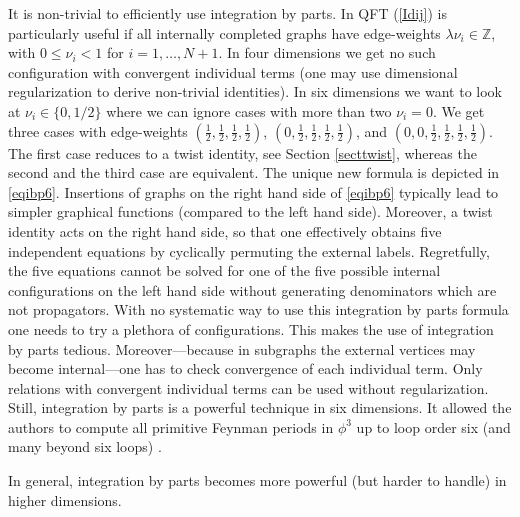\documentclass[oneside]{amsart}
\newcommand{\ZZ}{{\mathbb Z}}
\theoremstyle{plain}
\begin{document}
It is non-trivial to efficiently use integration by parts. In QFT (\ref{Idij}) is particularly useful if all internally completed graphs have edge-weights $\lambda\nu_i\in\ZZ$,
with $0\leq\nu_i<1$ for $i=1,\ldots,N+1$.
In four dimensions we get no such configuration with convergent individual terms (one may use dimensional regularization \cite{numfunct,7loops} to derive non-trivial identities).
In six dimensions we want to look at $\nu_i\in\{0,1/2\}$ where we can ignore cases with more than two $\nu_i=0$. We get three cases with edge-weights
$(\frac{1}{2},\frac{1}{2},\frac{1}{2},\frac{1}{2})$, $(0,\frac{1}{2},\frac{1}{2},\frac{1}{2},\frac{1}{2})$, and $(0,0,\frac{1}{2},\frac{1}{2},\frac{1}{2},\frac{1}{2})$.
The first case reduces to a twist identity, see Section \ref{secttwist}, whereas the second and the third case are equivalent.
The unique new formula is depicted in \eqref{eqibp6}. Insertions of graphs on the right hand side of \eqref{eqibp6} typically lead to simpler graphical
functions (compared to the left hand side).
Moreover, a twist identity acts on the right hand side, so that one effectively obtains five independent equations by cyclically permuting the external labels.
Regretfully, the five equations cannot be solved for one of the five possible internal configurations on the left hand side without generating denominators which
are not propagators. With no systematic way to use this integration by parts formula one needs to try a plethora of configurations. This makes the use of integration by parts tedious.
Moreover---because in subgraphs the external vertices may become internal---one has to check convergence of each individual term.
Only relations with convergent individual terms can be used without regularization. Still, integration by parts is a powerful technique in six dimensions.
It allowed the authors to compute all primitive Feynman periods in $\phi^3$ up to loop order six (and many beyond six loops) \cite{phi3,Shlog}.

In general, integration by parts becomes more powerful (but harder to handle) in higher dimensions.

\end{document}
